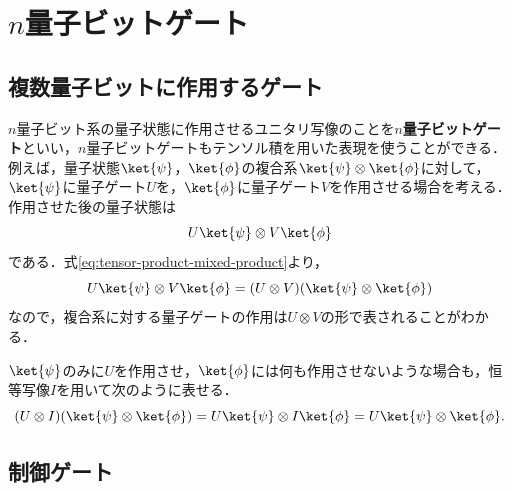 \section{$n$量子ビットゲート}

\subsection{複数量子ビットに作用するゲート}
$n$量子ビット系の量子状態に作用させるユニタリ写像のことを\textbf{$n$量子ビットゲート}といい，$n$量子ビットゲートもテンソル積を用いた表現を使うことができる．
例えば，量子状態$\ket{\psi}$，$\ket{\phi}$の複合系$\ket{\psi}\otimes\ket{\phi}$に対して，$\ket{\psi}$に量子ゲート$U$を，$\ket{\phi}$に量子ゲート$V$を作用させる場合を考える．作用させた後の量子状態は
\[
  U\ket{\psi}\otimes V\ket{\phi}
\]
である．式\eqref{eq:tensor-product-mixed-product}より，
\begin{equation*}
  U\ket{\psi}\otimes V\ket{\phi} = (U\otimes V)(\ket{\psi}\otimes\ket{\phi})
\end{equation*}
なので，複合系に対する量子ゲートの作用は$U\otimes V$の形で表されることがわかる．

$\ket{\psi}$のみに$U$を作用させ，$\ket{\phi}$には何も作用させないような場合も，恒等写像$I$を用いて次のように表せる．
\[
  (U\otimes I)(\ket{\psi}\otimes\ket{\phi}) = U\ket{\psi}\otimes I\ket{\phi} = U\ket{\psi}\otimes\ket{\phi}.
\]

\subsection{制御ゲート}

